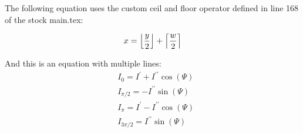 The following equation uses the custom ceil and floor operator defined in line 168 of the stock main.tex:

\begin{equation}
x = \floor*{\frac{y}{2}} + \ceil*{\frac{w}{2}}
\end{equation}


And this is an equation with multiple lines:
\begin{equation}
\begin{aligned}
&I_{0}=I^{\prime}+I^{\prime\prime}\cos(\varPsi)   \\
&I_{\pi/2}=-I^{\prime\prime}\sin(\varPsi)                \\
&I_{\pi}=I^{\prime}-I^{\prime\prime}\cos(\varPsi)   \\
&I_{3\pi/2}=I^{\prime\prime}\sin(\varPsi)
\end{aligned}
\end{equation}

